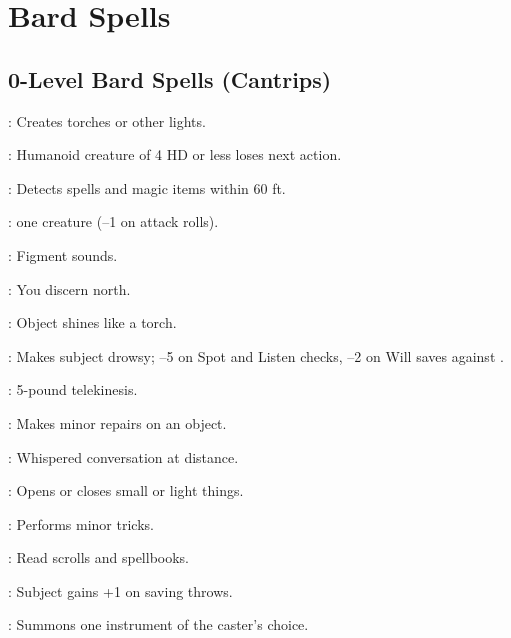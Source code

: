 \section{Bard Spells}

\begin{multicols}{2}

\subsection{0-Level Bard Spells (Cantrips)}
\begin{description*}
\item[\linkspell{Dancing Lights}:] Creates torches or other lights.
\item[\linkspell{Daze}:] Humanoid creature of 4 HD or less loses next action.
\item[\linkspell{Detect Magic}:] Detects spells and magic items within 60 ft.
\item[\linkspell{Flare}:]  one creature (–1 on attack rolls).
\item[\linkspell{Ghost Sound}:] Figment sounds.
\item[\linkspell{Know Direction}:] You discern north.
\item[\linkspell{Light}:] Object shines like a torch.
\item[\linkspell{Lullaby}:] Makes subject drowsy; –5 on Spot and Listen checks, –2 on Will saves against .
\item[\linkspell{Mage Hand}:] 5-pound telekinesis.
\item[\linkspell{Mending}:] Makes minor repairs on an object.
\item[\linkspell{Message}:] Whispered conversation at distance.
\item[\linkspell{Open/Close}:] Opens or closes small or light things.
\item[\linkspell{Prestidigitation}:] Performs minor tricks.
\item[\linkspell{Read Magic}:] Read scrolls and spellbooks.
\item[\linkspell{Resistance}:] Subject gains +1 on saving throws.
\item[\linkspell{Summon Instrument}:] Summons one instrument of the caster’s choice.
\end{description*}


\end{multicols}
